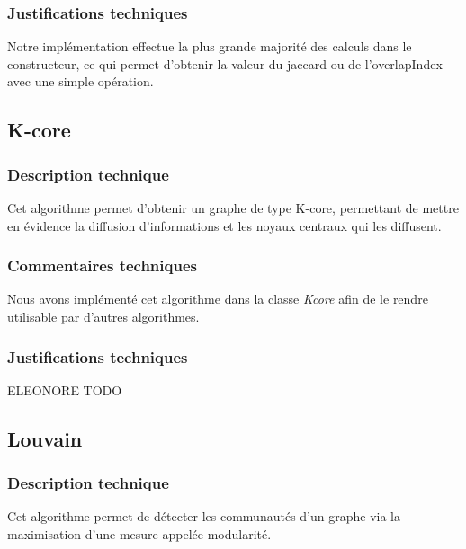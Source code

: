 \begin{titlepage}
{\subsubsection{Justifications techniques}
{
Notre implémentation effectue la plus grande majorité des calculs dans le constructeur, ce qui permet d'obtenir la valeur du jaccard ou de l'overlapIndex avec une simple opération.
}

\subsection{K-core}
\subsubsection{Description technique}
{
Cet algorithme permet d'obtenir un graphe de type K-core, permettant de mettre en évidence la diffusion d'informations et les noyaux centraux qui les diffusent.
}
\subsubsection{Commentaires techniques}
{
Nous avons implémenté cet algorithme dans la classe \textit{Kcore} afin de le rendre utilisable par d'autres algorithmes.
}
\subsubsection{Justifications techniques}
{
ELEONORE TODO
}

\subsection{Louvain}
\subsubsection{Description technique}
{
Cet algorithme permet de détecter les communautés d'un graphe via la maximisation d'une mesure appelée modularité.
}
}
\end{titlepage}
